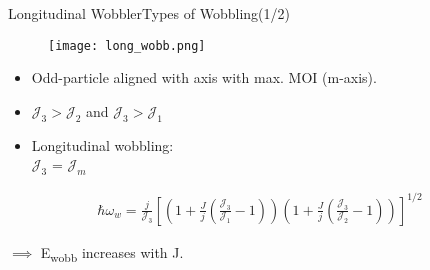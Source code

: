 \documentclass [11pt]{beamer}
\begin{document}
\begin{frame}{Longitudinal Wobbler}{Types of Wobbling(1/2)}
\begin{multicols}{2}
\begin{figure}
\begin{center}
\texttt{[image: long\_wobb.png]}
\end{center}
\end{figure}
\begin{itemize}
\item{Odd-particle aligned with axis with max. MOI (m-axis).}
\item{$\mathcal{J}_{3} > \mathcal{J}_{2}$ and $\mathcal{J}_{3} > \mathcal{J}_{1}$}
\item{Longitudinal wobbling: \\ $\mathcal{J}_{3}$ = $\mathcal{J}_{m}$}
\end{itemize}
\end{multicols}
\begin{center}
\begin{align*}
\hbar \omega_{w} = \frac{j}{\mathcal{J}_{3}} \left[\left(1+ \frac{J}{j} \left( \frac{\mathcal{J}_{3}}{\mathcal{J}_{1}} -1 \right) \right) \left( 1+ \frac{J}{j} \left( \frac{\mathcal{J}_{3}}{\mathcal{J}_{2}} -1 \right)\right)\right]^{1/2}
\end{align*}
\end{center}
$\implies$ E\textsubscript{wobb} increases with J.
\begin{center}
\end{center}
\end{frame}
\end{document}
